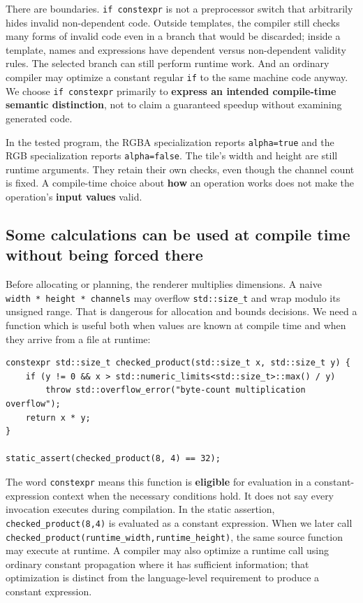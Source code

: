 There are boundaries. \texttt{if\ constexpr} is not a preprocessor switch that arbitrarily hides invalid non-dependent code. Outside templates, the compiler still checks many forms of invalid code even in a branch that would be discarded; inside a template, names and expressions have dependent versus non-dependent validity rules. The selected branch can still perform runtime work. And an ordinary compiler may optimize a constant regular \texttt{if} to the same machine code anyway. We choose \texttt{if\ constexpr} primarily to \textbf{express an intended compile-time semantic distinction}, not to claim a guaranteed speedup without examining generated code.

In the tested program, the RGBA specialization reports \texttt{alpha=true} and the RGB specialization reports \texttt{alpha=false}. The tile's width and height are still runtime arguments. They retain their own checks, even though the channel count is fixed. A compile-time choice about \textbf{how} an operation works does not make the operation's \textbf{input values} valid.

\subsection{Some calculations can be used at compile time without being forced there}\label{01-foundations-i-ch005-some-calculations-can-be-used-at-compile-time-without-being-forced-there}

Before allocating or planning, the renderer multiplies dimensions. A naive \texttt{width\ *\ height\ *\ channels} may overflow \texttt{std::size\_t} and wrap modulo its unsigned range. That is dangerous for allocation and bounds decisions. We need a function which is useful both when values are known at compile time and when they arrive from a file at runtime:

\begin{verbatim}
constexpr std::size_t checked_product(std::size_t x, std::size_t y) {
    if (y != 0 && x > std::numeric_limits<std::size_t>::max() / y)
        throw std::overflow_error("byte-count multiplication overflow");
    return x * y;
}

static_assert(checked_product(8, 4) == 32);
\end{verbatim}

The word \texttt{constexpr} means this function is \textbf{eligible} for evaluation in a constant-expression context when the necessary conditions hold. It does not say every invocation executes during compilation. In the static assertion, \texttt{checked\_product(8,4)} is evaluated as a constant expression. When we later call \texttt{checked\_product(runtime\_width,runtime\_height)}, the same source function may execute at runtime. A compiler may also optimize a runtime call using ordinary constant propagation where it has sufficient information; that optimization is distinct from the language-level requirement to produce a constant expression.

